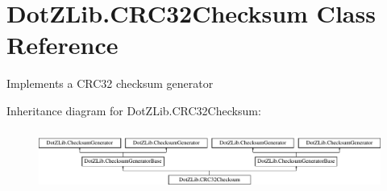 \hypertarget{class_dot_z_lib_1_1_c_r_c32_checksum}{}\section{Dot\+Z\+Lib.\+C\+R\+C32\+Checksum Class Reference}
\label{class_dot_z_lib_1_1_c_r_c32_checksum}


Implements a C\+R\+C32 checksum generator  


Inheritance diagram for Dot\+Z\+Lib.\+C\+R\+C32\+Checksum\+:\begin{figure}[H]
\begin{center}
\leavevmode
\includegraphics[height=1.981132cm]{class_dot_z_lib_1_1_c_r_c32_checksum}
\end{center}
\end{figure}
